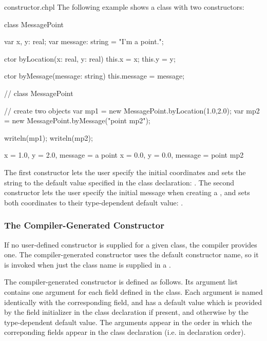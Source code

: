 \begin{chapelexample}{constructor.chpl}
The following example shows a class with two constructors:
\begin{chapel}
class MessagePoint {
  var x, y: real;
  var message: string = "I'm a point.";

  ctor byLocation(x: real, y: real) 
  { this.x = x; this.y = y; }

  ctor byMessage(message: string) 
  { this.message = message; }
}  // class MessagePoint

// create two objects
var mp1 = new MessagePoint.byLocation(1.0,2.0);
var mp2 = new MessagePoint.byMessage("point mp2");
\end{chapel}
\begin{chapelpost}
writeln(mp1);
writeln(mp2);
\end{chapelpost}
\begin{chapeloutput}
{x = 1.0, y = 2.0, message = a point}
{x = 0.0, y = 0.0, message = point mp2}
\end{chapeloutput}
The first constructor lets the user specify the initial coordinates
and sets the string to the default value specified in the class
declaration: .  The second constructor lets the user specify the initial message
when creating a , and sets both coordinates to their
type-dependent default value: .
\end{chapelexample}

\subsubsection{The Compiler-Generated Constructor}
\label{The_Compiler_Generated_Constructor}

If no user-defined constructor is supplied for a given class, the compiler
provides one.  The compiler-generated constructor uses the default constructor
name, so it is invoked when just the class name is supplied in
a .  

The compiler-generated constructor is defined as follows.  Its argument list
contains one argument for each field defined in the class.  Each argument is
named identically with the corresponding field, and has a default value
which is provided by the field initializer in the class declaration if present,
and otherwise by the type-dependent default value.
The arguments appear in the order in which the correponding fields appear in the
class declaration (i.e. in declaration order).

